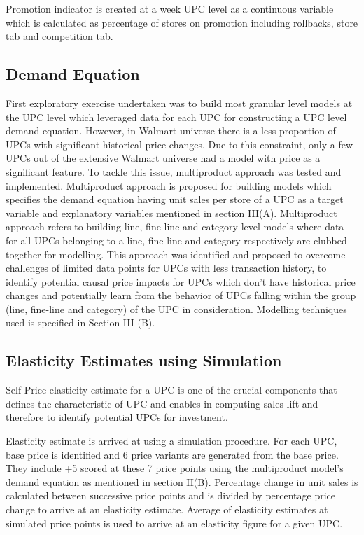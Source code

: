 Promotion indicator is created at a week UPC level as a continuous variable which is calculated as percentage of stores 
on promotion including rollbacks, store tab and competition tab.

\subsection{Demand Equation}
First exploratory exercise undertaken was to build most granular level models at the UPC level which leveraged data for 
each UPC for constructing a UPC level demand equation. However, in Walmart universe there is a less proportion of UPCs with 
significant historical price changes. Due to this constraint, only a few UPCs out of the extensive Walmart universe had a 
model with price as a significant feature. To tackle this issue, multiproduct approach was tested and implemented. 
Multiproduct approach is proposed for building models which specifies the demand equation having unit sales per store 
of a UPC as a target variable and explanatory variables mentioned in section III(A). Multiproduct approach refers to 
building line, fine-line and category level models where data for all UPCs belonging to a line, fine-line and category 
respectively are clubbed together for modelling. This approach was identified and proposed to overcome challenges of 
limited data points for UPCs with less transaction history, to identify potential causal price impacts for UPCs which 
don’t have historical price changes and potentially learn from the behavior of UPCs falling within the group 
(line, fine-line and category) of the UPC in consideration. Modelling techniques used is specified in Section III (B).

\subsection{Elasticity Estimates using Simulation}
Self-Price elasticity estimate for a UPC is one of the crucial components that defines the characteristic of UPC and enables 
in computing sales lift and therefore to identify potential UPCs for investment.

Elasticity estimate is arrived at using a simulation procedure. For each UPC, base price is identified and 6 price variants 
are generated from the base price. They include +5%
scored at these 7 price points using the multiproduct model’s demand equation as mentioned in section II(B). Percentage change 
in unit sales is calculated between successive price points and is divided by percentage price change to arrive at an 
elasticity estimate. Average of elasticity estimates at simulated price points is used to arrive at an elasticity figure 
for a given UPC.

